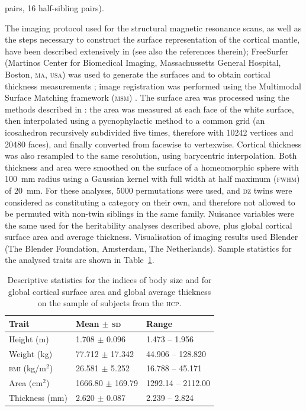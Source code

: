 pairs, 16 half-sibling pairs).

The imaging protocol used for the structural magnetic resonance scans, as well as the steps necessary to construct the surface representation of the cortical mantle, have been described extensively in \citet{Glasser2013} (see also the references therein); FreeSurfer (Martinos Center for Biomedical Imaging, Massachussetts General Hospital, Boston, \textsc{ma}, \textsc{usa}) was used to generate the surfaces and to obtain cortical thickness measurements \citep{Dale1999, Fischl1999, Fischl2000}; image registration was performed using the Multimodal Surface Matching framework (\textsc{msm}) \citep{Robinson2014}. The surface area was processed using the methods described in \citet{Winkler2012}: the area was measured at each face of the white surface, then interpolated using a pycnophylactic method to a common grid (an icosahedron recursively subdivided five times, therefore with 10242 vertices and 20480 faces), and finally converted from facewise to vertexwise. Cortical thickness was also resampled to the same resolution, using barycentric interpolation. Both thickness and area were smoothed on the surface of a homeomorphic sphere with 100~mm radius using a Gaussian kernel with full width at half maximum (\textsc{fwhm}) of 20~mm. For these analyses, 5000 permutations were used, and \textsc{dz} twins were considered as constituting a category on their own, and therefore not allowed to be permuted with non-twin siblings in the same family. Nuisance variables were the same used for the heritability analyses described above, plus global cortical surface area and average thickness. Visualisation of imaging results used Blender (The Blender Foundation, Amsterdam, The Netherlands). Sample statistics for the analysed traits are shown in Table~\ref{tab:samplestats}.

\begin{table}[!tb]
\caption{Descriptive statistics for the indices of body size and for global cortical surface area and global average thickness on the sample of subjects from the \textsc{hcp}.}
{\small
\begin{center}
\begin{tabular}{@{}lll@{}}
\toprule
Trait & Mean $\pm$ \textsc{sd} & Range\\
\midrule
Height (m) & 1.708 $\pm$ 0.096 & 1.473 -- 1.956\\
Weight (kg) & 77.712 $\pm$ 17.342 & 44.906 -- 128.820\\
\textsc{bmi} (kg/m$^2$) & 26.581 $\pm$ 5.252 & 16.788 -- 45.171\\
Area (cm$^2$) & 1666.80 $\pm$ 169.79 & 1292.14 -- 2112.00\\
Thickness (mm) & 2.620 $\pm$ 0.087 & 2.239 -- 2.824\\
\bottomrule   
\end{tabular}
\end{center}}
\label{tab:samplestats}
\end{table}

